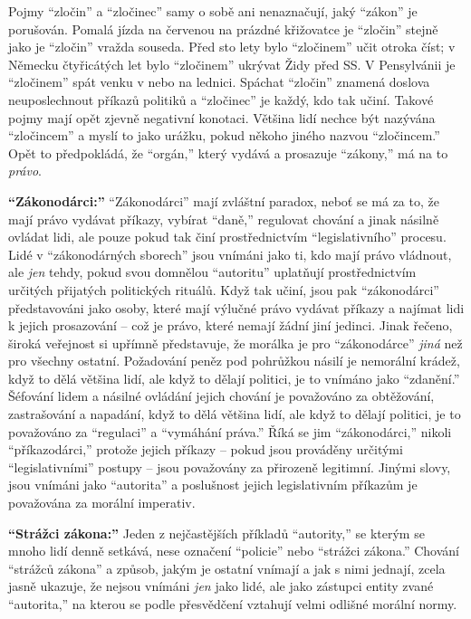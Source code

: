 \documentclass{book}
\begin{document}
Pojmy \enquote{zločin} a \enquote{zločinec} samy o sobě ani nenaznačují, jaký \enquote{zákon} je porušován. Pomalá jízda na červenou na prázdné křižovatce je \enquote{zločin} stejně jako je \enquote{zločin} vražda souseda. Před sto lety bylo \enquote{zločinem} učit otroka číst; v Německu čtyřicátých let bylo \enquote{zločinem} ukrývat Židy před SS. V Pensylvánii je \enquote{zločinem} spát venku v nebo na lednici. Spáchat \enquote{zločin} znamená doslova neuposlechnout příkazů politiků a \enquote{zločinec} je každý, kdo tak učiní. Takové pojmy mají opět zjevně negativní konotaci. Většina lidí nechce být nazývána \enquote{zločincem} a myslí to jako urážku, pokud někoho jiného nazvou \enquote{zločincem.} Opět to předpokládá, že \enquote{orgán,} který vydává a prosazuje \enquote{zákony,} má na to \emph{právo}.

\textbf{\enquote{Zákonodárci:}} \enquote{Zákonodárci} mají zvláštní paradox, neboť se má za to, že mají právo vydávat příkazy, vybírat \enquote{daně,} regulovat chování a jinak násilně ovládat lidi, ale pouze pokud tak činí prostřednictvím \enquote{legislativního} procesu. Lidé v \enquote{zákonodárných sborech} jsou vnímáni jako ti, kdo mají právo vládnout, ale \emph{jen} tehdy, pokud svou domnělou \enquote{autoritu} uplatňují prostřednictvím určitých přijatých politických rituálů. Když tak učiní, jsou pak \enquote{zákonodárci} představováni jako osoby, které mají výlučné právo vydávat příkazy a najímat lidi k jejich prosazování -- což je právo, které nemají žádní jiní jedinci. Jinak řečeno, široká veřejnost si upřímně představuje, že morálka je pro \enquote{zákonodárce} \emph{jiná} než pro všechny ostatní. Požadování peněz pod pohrůžkou násilí je nemorální krádež, když to dělá většina lidí, ale když to dělají politici, je to vnímáno jako \enquote{zdanění.} Šéfování lidem a násilné ovládání jejich chování je považováno za obtěžování, zastrašování a napadání, když to dělá většina lidí, ale když to dělají politici, je to považováno za \enquote{regulaci} a \enquote{vymáhání práva.} Říká se jim \enquote{zákonodárci,} nikoli \enquote{příkazodárci,} protože jejich příkazy -- pokud jsou prováděny určitými \enquote{legislativními} postupy -- jsou považovány za přirozeně legitimní. Jinými slovy, jsou vnímáni jako \enquote{autorita} a poslušnost jejich legislativním příkazům je považována za morální imperativ.

\textbf{\enquote{Strážci zákona:}} Jeden z nejčastějších příkladů \enquote{autority,} se kterým se mnoho lidí denně setkává, nese označení \enquote{policie} nebo \enquote{strážci zákona.} Chování \enquote{strážců zákona} a způsob, jakým je ostatní vnímají a jak s nimi jednají, zcela jasně ukazuje, že nejsou vnímáni \emph{jen} jako lidé, ale jako zástupci entity zvané \enquote{autorita,} na kterou se podle přesvědčení vztahují velmi odlišné morální normy.
\end{document}
